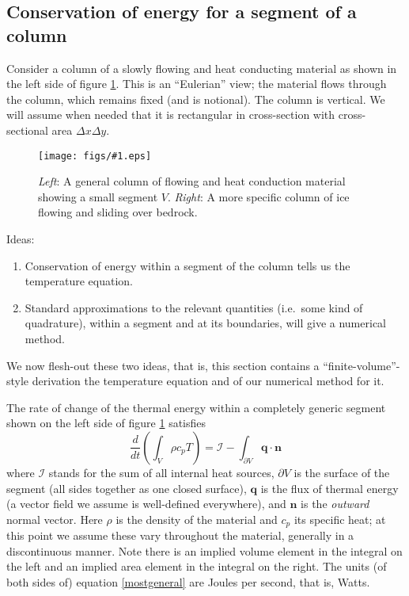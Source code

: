 \documentclass[12pt,final]{amsart}%
\theoremstyle{plain}
\theoremstyle{definition}
\theoremstyle{remark}
\newcommand{\regfigure}[2]{\texttt{[image: figs/\#1.eps]}}
\newcommand{\DDt}[1]{\ensuremath{\frac{d #1}{d t}}}
\newcommand{\nhat}{\mathbf{n}}
\newcommand{\bq}{{\mathbf{q}}}
\begin{document}
\subsection*{Conservation of energy for a segment of a column}  Consider a column of a slowly flowing and heat conducting material as shown in the left side of figure \ref{fig:earlycols}.  This is an ``Eulerian'' view; the material flows through the column, which remains fixed (and is notional).  The column is vertical.  We will assume when needed that it is rectangular in cross-section with cross-sectional area $\Delta x\Delta y$.

\begin{figure}[ht]
\vspace{0.2in}
\hspace{1.0in}\regfigure{earlycols}{2.6}
\vspace{0.2in}
\caption{\emph{Left}: A general column of flowing and heat conduction material showing a small segment $V$.  \emph{Right}: A more specific column of ice flowing and sliding over bedrock.}
\label{fig:earlycols}
\end{figure}

Ideas: \begin{enumerate}
\item Conservation of energy within a segment of the column  tells us the temperature equation.
\item Standard approximations to the relevant quantities (i.e.~some kind of quadrature), within a segment and at its boundaries, will give a numerical method.\end{enumerate}
We now flesh-out these two ideas, that is, this section contains a ``finite-volume''-style derivation the temperature equation and of our numerical method for it.

The rate of change of the thermal energy within a completely generic segment shown on the left side of figure \ref{fig:earlycols} satisfies
\begin{equation}\label{mostgeneral}
\DDt{}\left(\int_V \rho c_p T\right) = \mathcal{I} - \int_{\partial V} \bq \cdot \nhat
\end{equation}
where $\mathcal{I}$ stands for the sum of all internal heat sources, $\partial V$ is the surface of the segment (all sides together as one closed surface), $\bq$ is the flux of thermal energy (a vector field we assume is well-defined everywhere), and $\nhat$ is the \emph{outward} normal vector.  Here $\rho$ is the density of the material and $c_p$ its specific heat; at this point we assume these vary throughout the material, generally in a discontinuous manner.  Note there is an implied volume element in the integral on the left and an implied area element in the integral on the right.  The units (of both sides of) equation \eqref{mostgeneral} are Joules per second, that is, Watts.
\end{document}
